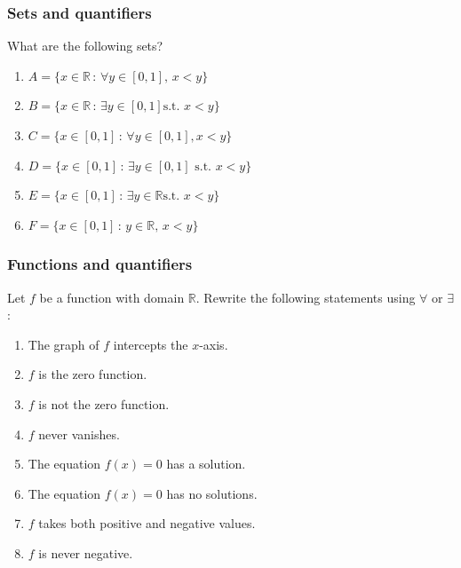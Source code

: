 \documentclass[14pt]{beamer}
\begin{document}
\begin{frame}
	\frametitle{Sets and quantifiers}

	What are the following sets?

	\begin{enumerate}
		\item $\displaystyle A = \{ x \in \mathbb{R}\, : \, \forall y \in [0,1], \, x
			< y \}$

		\item $\displaystyle B = \{ x \in \mathbb{R}\, : \, \exists y \in [0,1] \text{
			s.t. }x < y \}$

		\item $\displaystyle C = \{ x \in [0,1] \, : \, \forall y \in [0,1], x < y \}$

		\item $\displaystyle D = \{ x \in [0,1] \, : \, \exists y \in [0,1] \text{ s.t.
			}x < y \}$

		\item $\displaystyle E = \{ x \in [0,1] \, : \, \exists y \in \mathbb{R}\text{
			s.t. }x < y \}$

		\item $\displaystyle F = \{ x \in [0,1] \, : \, y \in \mathbb{R}, \, x < y \}$
	\end{enumerate}
\end{frame}

\begin{frame}
	\frametitle{Functions and quantifiers}

	Let $f$ be a function with domain $\mathbb{R}$. Rewrite the following statements
	using $\forall$ or $\exists$:

	\begin{enumerate}
		\item The graph of $f$ intercepts the $x$-axis.

		\item $f$ is the zero function.

		\item $f$ is not the zero function.

		\item $f$ never vanishes.

		\item The equation $\displaystyle f(x)=0$ has a solution.

		\item The equation $\displaystyle f(x)=0$ has no solutions.

		\item $f$ takes both positive and negative values.

		\item $f$ is never negative.
	\end{enumerate}
\end{frame}
\end{document}
